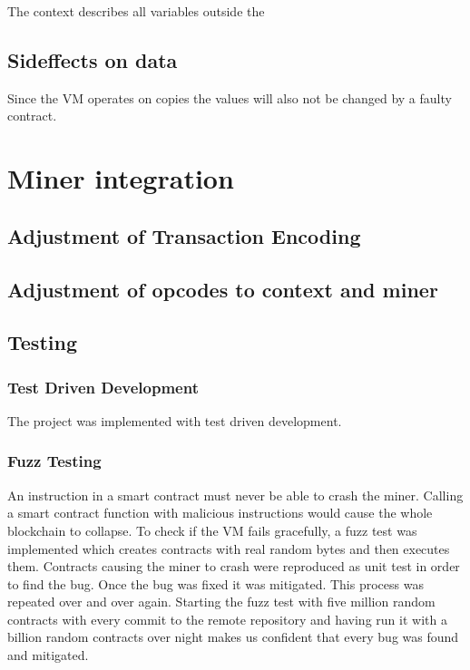 The context describes all variables outside the 

\subsection{Sideffects on data}

Since the VM operates on copies the values will also not be changed by a faulty contract.

\section{Miner integration}

\subsection{Adjustment of Transaction Encoding}

\subsection{Adjustment of opcodes to context and miner}

\subsection{Testing}
\subsubsection{Test Driven Development}
The project was implemented with test driven development.

\subsubsection{Fuzz Testing}
An instruction in a smart contract must never be able to crash the miner. Calling a smart contract function with malicious instructions would cause the whole blockchain to collapse. To check if the VM fails gracefully, a fuzz test was implemented which creates contracts with real random bytes and then executes them. Contracts causing the miner to crash were reproduced as unit test in order to find the bug. Once the bug was fixed it was mitigated. This process was repeated over and over again. Starting the fuzz test with five million random contracts with every commit to the remote repository and having run it with a billion random contracts over night makes us confident that every bug was found and mitigated.

